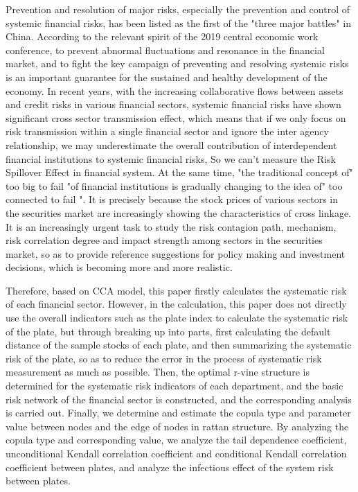 \begin{eabstract}
Prevention and resolution of major risks, especially the prevention and control of systemic financial risks, has been listed as the first of the "three major battles" in China. According to the relevant spirit of the 2019 central economic work conference, to prevent abnormal fluctuations and resonance in the financial market, and to fight the key campaign of preventing and resolving systemic risks is an important guarantee for the sustained and healthy development of the economy. In recent years, with the increasing collaborative flows between assets and credit risks in various financial sectors, systemic financial risks have shown significant cross sector transmission effect, which means that if we only focus on risk transmission within a single financial sector and ignore the inter agency relationship, we may underestimate the overall contribution of interdependent financial institutions to systemic financial risks, So we can't measure the Risk Spillover Effect in financial system. At the same time, "the traditional concept of" too big to fail "of financial institutions is gradually changing to the idea of" too connected to fail ". It is precisely because the stock prices of various sectors in the securities market are increasingly showing the characteristics of cross linkage. It is an increasingly urgent task to study the risk contagion path, mechanism, risk correlation degree and impact strength among sectors in the securities market, so as to provide reference suggestions for policy making and investment decisions, which is becoming more and more realistic.



Therefore, based on CCA model, this paper firstly calculates the systematic risk of each financial sector. However, in the calculation, this paper does not directly use the overall indicators such as the plate index to calculate the systematic risk of the plate, but through breaking up into parts, first calculating the default distance of the sample stocks of each plate, and then summarizing the systematic risk of the plate, so as to reduce the error in the process of systematic risk measurement as much as possible. Then, the optimal r-vine structure is determined for the systematic risk indicators of each department, and the basic risk network of the financial sector is constructed, and the corresponding analysis is carried out. Finally, we determine and estimate the copula type and parameter value between nodes and the edge of nodes in rattan structure. By analyzing the copula type and corresponding value, we analyze the tail dependence coefficient, unconditional Kendall correlation coefficient and conditional Kendall correlation coefficient between plates, and analyze the infectious effect of the system risk between plates.




\end{eabstract}
